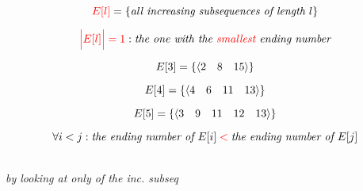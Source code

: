 \begin{frame}{}
  \[
    \textcolor{red}{E[l]} = \left\{\text{\it all increasing subsequences of length $l$}\right\}
  \]

  \[
    \textcolor{red}{\Big|E[l]\Big| = 1}: \text{\it the one with the \textcolor{red}{\it smallest} ending number}
  \]

  \pause
  \[
    E[3] = \left\{\langle 2\quad 8\quad 15 \rangle\right\}
  \]
  
  \[
    E[4] = \left\{\langle 4\quad 6\quad 11\quad 13 \rangle\right\}
  \]

  \[
    E[5] = \left\{\langle 3\quad 9\quad 11\quad 12\quad 13 \rangle\right\}
  \]

  \pause
  \[
    \forall i < j: \text{\it the ending number of } E[i] \;\textcolor{red}{<}\; \text{\it the ending number of } E[j]
  \]
\end{frame}

\begin{frame}{}
  

\end{frame}

\begin{frame}{}
  \begin{center}
    {\Large \it {}} \\[6pt] \pause
    {\large \it by looking at only  of the inc. subseq}
  \end{center}

  \pause
  
\end{frame}

%   



